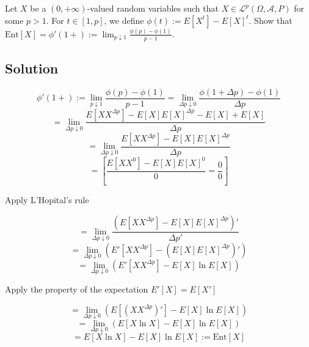 \documentclass{article}
\begin{document}
Let $X$ be a $(0, +\infty)$-valued random variables such that $X \in \mathcal L^p (\Omega, \mathcal A, P)$ for some $p > 1$. For $t \in [1, p]$, we define $\phi(t) := E[X^t] - E[X]^t$. Show that $\text{Ent}[X] = \phi'(1+) := \lim_{p\downarrow 1}\frac{\phi(p) - \phi(1)}{p - 1}$.

\subsection*{Solution}

$$\phi'(1+) := 
\lim_{p \downarrow 1}\frac{\phi(p) - \phi(1)}{p-1} 
=\lim_{\Delta p \downarrow 0}\frac{\phi(1 + \Delta p) - \phi(1)}{\Delta p}$$
$$=\lim_{\Delta p \downarrow 0}\frac{E[XX^{\Delta p}] - E[X]E[X]^{\Delta p} - E[X] + E[X]}{\Delta p}$$
$$=\lim_{\Delta p \downarrow 0}\frac{E[XX^{\Delta p}] - E[X]E[X]^{\Delta p}}{\Delta p}$$
$$=\left[ \frac{E[XX^0] - E[X]E[X]^0}{0} = \frac{0}{0}\right]$$

Apply L'Hopital's rule

$$= 
\lim_{\Delta p \downarrow 0}\frac{\left(E[XX^{\Delta p}] - E[X]E[X]^{\Delta p}\right)'}{\Delta p'}$$
$$=\lim_{\Delta p \downarrow 0}\left(E'[XX^{\Delta p}] - (E[X]E[X]^{\Delta p})'\right)$$
$$=\lim_{\Delta p \downarrow 0}\left(E'[XX^{\Delta p}] - E[X]\ln E[X]\right)$$

Apply the property of the expectation $E'[X] = E[X']$

$$= 
\lim_{\Delta p \downarrow 0}\left(E\left[(XX^{\Delta p})'\right] - E[X]\ln E[X]\right)$$
$$=\lim_{\Delta p \downarrow 0}\left(E[X \ln X] - E[X]\ln E[X]\right)$$
$$=E[X \ln X] - E[X]\ln E[X] := \text{Ent}[X]$$
\end{document}
